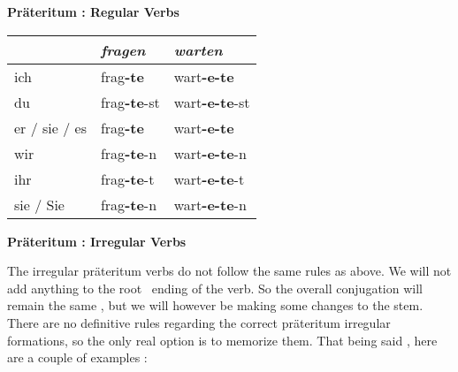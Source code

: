 \documentclass[a4paper,twocolumn,10pt]{article}
\newcommand{\newpar}
{\par \vspace{0.3cm}}
\newcommand{\tabularxtable}[3]
{

	\vspace{0.5cm}
	\nolinenumbers

	\begin{tabularx}{#1}{#2}
		#3
	\end{tabularx}

	\linenumbers
	\vspace{0.5cm}
}
\begin{document}
\textbf{Präteritum : Regular Verbs}\cite{em}
\tabularxtable
{0.95\linewidth}
{X|XX}
{

	&
	\textit{fragen} &
	\textit{warten} \\
	\midrule

	\cellcolor{table-subtopic} ich &
	frag\textcolor{green-goethe}{\textbf{-te}} &
	wart\textcolor{green-goethe}{\textbf{-e-te}} \\

	\cellcolor{table-subtopic} du &
	\cellcolor{table-alternating-blue}
	frag\textcolor{green-goethe}{\textbf{-te}}-st &
	\cellcolor{table-alternating-blue}
	wart\textcolor{green-goethe}{\textbf{-e-te}}-st \\

	\cellcolor{table-subtopic} er / sie / es &
	frag\textcolor{green-goethe}{\textbf{-te}} &
	wart\textcolor{green-goethe}{\textbf{-e-te}} \\

	\cellcolor{table-subtopic} wir &
	\cellcolor{table-alternating-blue}
	frag\textcolor{green-goethe}{\textbf{-te}}-n &
	\cellcolor{table-alternating-blue}
	wart\textcolor{green-goethe}{\textbf{-e-te}}-n \\

	\cellcolor{table-subtopic} ihr &
	frag\textcolor{green-goethe}{\textbf{-te}}-t &
	wart\textcolor{green-goethe}{\textbf{-e-te}}-t \\


	\cellcolor{table-subtopic} sie / Sie &
	\cellcolor{table-alternating-blue}
	frag\textcolor{green-goethe}{\textbf{-te}}-n &
	\cellcolor{table-alternating-blue}
	wart\textcolor{green-goethe}{\textbf{-e-te}}-n \\


}



\textbf{Präteritum : Irregular Verbs}\cite{em}

The irregular präteritum verbs do not follow the same rules as above. We will
not add anything to the root \ ending of the verb. So the overall conjugation
will remain the same , but we will however be making some changes to the stem.
There are no definitive rules regarding the correct präteritum irregular
formations, so the only real option is to memorize them. That being said , here
are a couple of examples :\newpar
\end{document}
